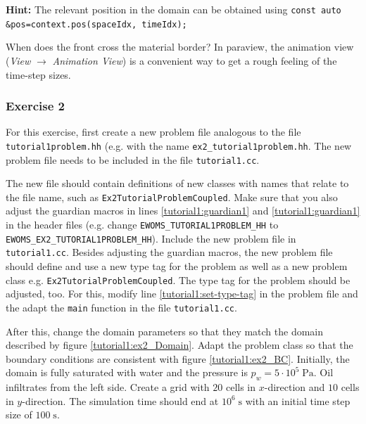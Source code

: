 \begin{enumerate}
\textbf{Hint:} The relevant position in the domain can be obtained using
\texttt{const auto \&pos=context.pos(spaceIdx, timeIdx);}

When does the front cross the material border? In paraview, the
animation view (\emph{View} $\rightarrow$ \textit{Animation View})
is a convenient way to get a rough feeling of the time-step sizes.
\end{enumerate}

\subsubsection{Exercise 2}

For this exercise, first create a new problem file analogous to the
file \texttt{tutorial1problem.hh} (e.g. with the name
\texttt{ex2\_tutorial1problem.hh}. The new problem
file needs to be included in the file \texttt{tutorial1.cc}.

The new file should contain definitions of new classes with names that
relate to the file name, such as
\texttt{Ex2TutorialProblemCoupled}. Make sure that you also adjust the
guardian macros in lines \ref{tutorial1:guardian1} and
\ref{tutorial1:guardian1} in the header files (e.g. change
\mbox{\texttt{EWOMS\_TUTORIAL1PROBLEM\_HH}} to
\mbox{\texttt{EWOMS\_EX2\_TUTORIAL1PROBLEM\_HH}}). Include the
new problem file in \texttt{tutorial1.cc}.  Besides adjusting
the guardian macros, the new problem file should define and use a new
type tag for the problem as well as a new problem class
e.g. \mbox{\texttt{Ex2TutorialProblemCoupled}}. The type tag for the
problem should be adjusted, too. For this, modify line
\ref{tutorial1:set-type-tag} in the problem file and the adapt
the \texttt{main} function in the file \texttt{tutorial1.cc}.

After this, change the domain parameters so that they match the domain
described by figure \ref{tutorial1:ex2_Domain}. Adapt the
problem class so that the boundary conditions are consistent with
figure \ref{tutorial1:ex2_BC}. Initially, the domain is fully
saturated with water and the pressure is $p_w = 5\cdot
10^5\;\text{Pa}$. Oil infiltrates from the left side. Create a grid
with $20$ cells in $x$-direction and $10$ cells in $y$-direction. The
simulation time should end at $10^6\;\text{s}$ with an initial time
step size of $100\;\text{s}$.

